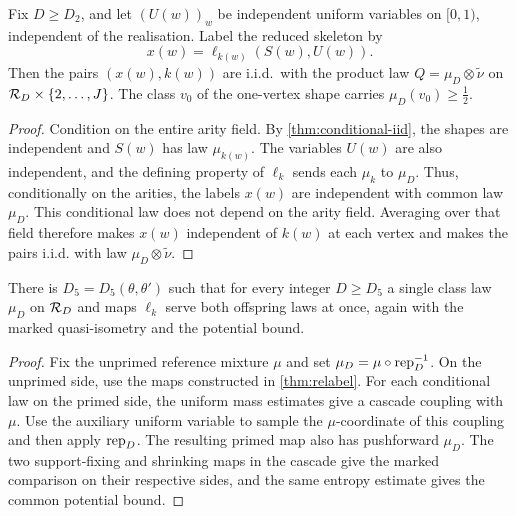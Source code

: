 \begin{proposition}
\label{thm:product-form}
\leanok
Fix $D\geq D_2$, and let $(U(w))_w$ be independent uniform variables on $[0,1)$, independent
of the realisation. Label the reduced skeleton by
\[
 x(w)=\ell_{k(w)}(S(w),U(w)).
\]
Then the pairs $(x(w),k(w))$ are i.i.d.\ with the product law
$Q=\mu_D\otimes\widetilde\nu$ on $\mathcal{R}_D\times\{2,\dots,J\}$. The class $v_0$ of the
one-vertex shape carries $\mu_D(v_0)\geq\tfrac12$.
\end{proposition}

\begin{proof}
\leanok
{}
Condition on the entire arity field. By \cref{thm:conditional-iid}, the shapes are independent
and $S(w)$ has law $\mu_{k(w)}$. The variables $U(w)$ are also independent, and the defining
property of $\ell_k$ sends each $\mu_k$ to $\mu_D$. Thus, conditionally on the arities, the
labels $x(w)$ are independent with common law $\mu_D$. This conditional law does not depend on
the arity field. Averaging over that field therefore makes $x(w)$ independent of $k(w)$ at each
vertex and makes the pairs i.i.d. with law $\mu_D\otimes\widetilde\nu$.
\end{proof}

\begin{lemma}
\label{thm:cross-relabel}
\leanok
There is $D_5=D_5(\theta,\theta')$ such that for every integer $D\geq D_5$ a single class law
$\mu_D$ on $\mathcal{R}_D$ and maps $\ell_k$ serve both offspring laws at once, again with the marked
quasi-isometry and the potential bound.
\end{lemma}

\begin{proof}
\leanok
{}
Fix the unprimed reference mixture $\mu$ and set
$\mu_D=\mu\circ\operatorname{rep}_D^{-1}$. On the unprimed side, use the maps constructed in
\cref{thm:relabel}. For each conditional law on the primed side, the uniform mass estimates give
a cascade coupling with $\mu$. Use the auxiliary uniform variable to sample the $\mu$-coordinate
of this coupling and then apply $\operatorname{rep}_D$. The resulting primed map also has pushforward
$\mu_D$. The two support-fixing and shrinking maps in the cascade give the marked comparison on
their respective sides, and the same entropy estimate gives the common potential bound.
\end{proof}

